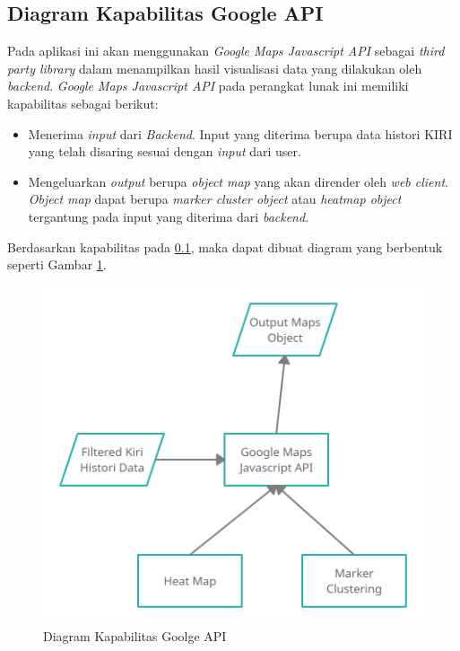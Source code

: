 \subsection{Diagram Kapabilitas Google API}
\label{sec:googleCapabilityDiagram}
Pada aplikasi ini akan menggunakan \textit{Google Maps Javascript API} sebagai \textit{third party library} dalam menampilkan hasil visualisasi data yang dilakukan oleh \textit{backend}. \textit{Google Maps Javascript API} pada perangkat lunak ini memiliki kapabilitas sebagai berikut:
\begin{itemize}
    \item Menerima \textit{input} dari \textit{Backend}. Input yang diterima berupa data histori KIRI yang telah disaring sesuai dengan  \textit{input} dari user.
    \item Mengeluarkan \textit{output} berupa \textit{object map} yang akan dirender oleh \textit{web client}. \textit{Object map} dapat berupa \textit{marker cluster object} atau \textit{heatmap object} tergantung pada input yang diterima dari \textit{backend}.
\end{itemize}
Berdasarkan kapabilitas pada \ref{sec:googleCapabilityDiagram}, maka dapat dibuat diagram yang berbentuk seperti Gambar \ref{fig:googleCapabilityDiagram}.

\begin{figure}[H]
	\centering  
	\includegraphics[scale=0.25]{Gambar/Kiri_GoogleAPI_Capabilty.png}  
	\caption[Rancangan Diagram Kapabilitas]{Diagram Kapabilitas Goolge API} 
	\label{fig:googleCapabilityDiagram} 
\end{figure}

